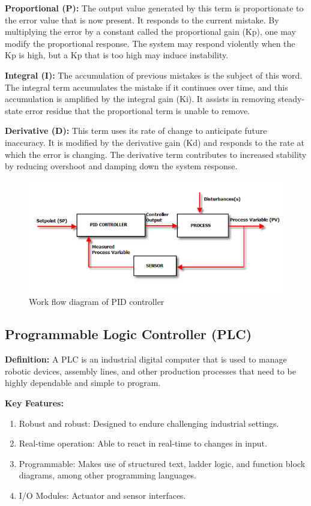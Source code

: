 \textbf{Proportional (P):} The output value generated by this term is
proportionate to the error value that is now present. It responds to the
current mistake. By multiplying the error by a constant called the
proportional gain (Kp), one may modify the proportional response. The
system may respond violently when the Kp is high, but a Kp that is too
high may induce instability.

\textbf{Integral (I):} The accumulation of previous mistakes is the
subject of this word. The integral term accumulates the mistake if it
continues over time, and this accumulation is amplified by the integral
gain (Ki). It assists in removing steady-state error residue that the
proportional term is unable to remove.

\textbf{Derivative (D):} This term uses its rate of change to anticipate
future inaccuracy. It is modified by the derivative gain (Kd) and
responds to the rate at which the error is changing. The derivative term
contributes to increased stability by reducing overshoot and damping
down the system response.

\begin{figure}[h!]
  \centering
  \includegraphics[width=0.7\linewidth]{figs/control_instrumentation/image8.png}
  \caption{Work flow diagram of PID controller}
  \label{fig:Work flow diagram of PID controller}
\end{figure}

\subsection{Programmable Logic Controller (PLC)}

\textbf{Definition:} A PLC is an industrial digital computer that is
used to manage robotic devices, assembly lines, and other production
processes that need to be highly dependable and simple to program.

\textbf{Key Features:}

\begin{enumerate}
\item
  Robust and robust: Designed to endure challenging industrial settings.
\item
  Real-time operation: Able to react in real-time to changes in input.
\item
  Programmable: Makes use of structured text, ladder logic, and function
  block diagrams, among other programming languages.
\item
  I/O Modules: Actuator and sensor interfaces.
\end{enumerate}

